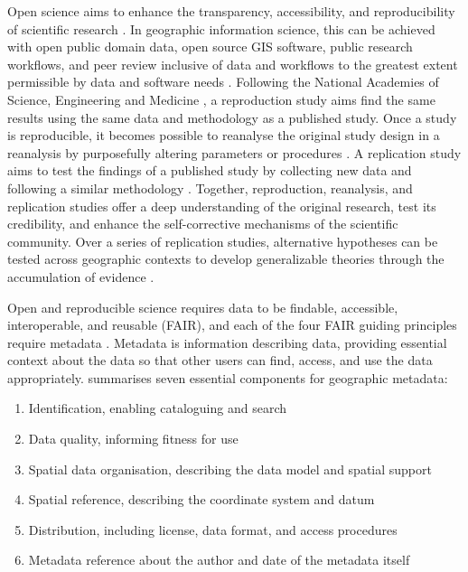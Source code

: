 \documentclass{isprs} %
\begin{document}
Open science aims to enhance the transparency, accessibility, and reproducibility of scientific research \citep{NASEM2018}.
In geographic information science, this can be achieved with open public domain data, open source GIS software, public research workflows, and peer review inclusive of data and workflows to the greatest extent permissible by data and software needs \citep{Singleton2016}. 
Following the National Academies of Science, Engineering and Medicine \citep{NASEM2019}, a reproduction study aims find the same results using the same data and methodology as a published study.
Once a study is reproducible, it becomes possible to reanalyse the original study design in a reanalysis by purposefully altering parameters or procedures \citep{Christensen2019}. 
A replication study aims to test the findings of a published study by collecting new data and following a similar methodology \citep{NASEM2019}.
Together, reproduction, reanalysis, and replication studies offer a deep understanding of the original research, test its credibility, and enhance the self-corrective mechanisms of the scientific community.
Over a series of replication studies, alternative hypotheses can be tested across geographic contexts to develop generalizable theories through the accumulation of evidence \citep{Kedron_Holler_2022}.

Open and reproducible science requires data to be findable, accessible, interoperable, and reusable (FAIR), and each of the four FAIR guiding principles require metadata \citep{Wilkinson2016, NASEM2018}.
Metadata is information describing data, providing essential context about the data so that other users can find, access, and use the data appropriately.
\citet{Kim1999} summarises seven essential components for geographic metadata:

\begin{enumerate}
\setlength\itemsep{0em}\setlength\parskip{0em}\setlength\topsep{0em}\setlength\partopsep{0em}\setlength\parsep{0em} 
\item{Identification, enabling cataloguing and search} 
\item{Data quality, informing fitness for use}
\item{Spatial data organisation, describing the data model and spatial support}
\item{Spatial reference, describing the coordinate system and datum}
\item{Distribution, including license, data format, and access procedures}
\item{Metadata reference about the author and date of the metadata itself}
\end{enumerate}
\end{document}
